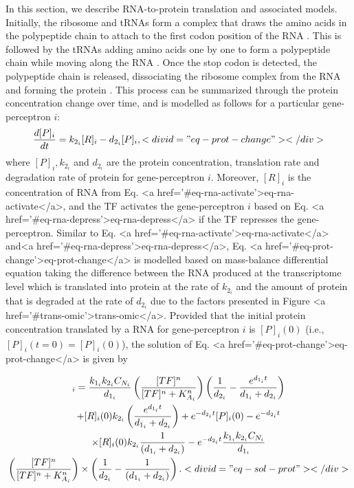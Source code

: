 \documentclass[twocolumn]{biophys-new}
\begin{document}
{{In this section, we describe RNA-to-protein translation and associated models.
Initially, the ribosome and tRNAs form a complex that draws the amino acids in the polypeptide chain to attach to the first codon position of the RNA \cite{saito2020translational}. This is followed by the tRNAs adding amino acids one by one to form a polypeptide chain while moving along the RNA \cite{xu2022functions}. Once the stop codon is detected, the polypeptide chain is released, dissociating the ribosome complex from the RNA and forming the protein \cite{marintchev2012fidelity}. This process can be summarized through the protein concentration change over time, and is modelled as follows for a particular gene-perceptron $i$:
\vspace{-0.2em}
\begin{equation}
\dfrac{d[P]_i}{dt} = k_{2_i}[R]_i - d_{2_i} [P]_i,<div id="eq-prot-change"></div>

\end{equation} 
where $[P]_i, k_{2_i}$ and $d_{2_i}$ are the protein concentration, translation rate and degradation rate of protein for gene-perceptron $i$. Moreover, $[R]_i$ is the concentration of RNA from Eq. <a href='#eq-rna-activate'>eq-rna-activate</a>, and the TF activates the gene-perceptron $i$ based on Eq. <a href='#eq-rna-depress'>eq-rna-depress</a> if the TF represses the gene-perceptron. Similar to Eq. <a href='#eq-rna-activate'>eq-rna-activate</a> and<a href='#eq-rna-depress'>eq-rna-depress</a>, Eq. <a href='#eq-prot-change'>eq-prot-change</a> is modelled based on mass-balance differential equation taking the difference between the RNA produced at the transcriptome level which is translated into protein at the rate of $k_{2_i}$ and the amount of protein that is degraded at the rate of $d_{2_i}$ due to the factors presented in Figure <a href='#trans-omic'>trans-omic</a>. 
Provided that the initial protein concentration translated by a RNA for gene-perceptron $i$ is $[P]_i(0)$ (i.e., $[P]_i(t=0)=[P]_i(0)$), the solution of Eq. <a href='#eq-prot-change'>eq-prot-change</a> is given by

\begin{multline}
[P]_i = \dfrac{k_{1_i}k_{2_i}C_{N_i}}{d_{1_i}} \left( \dfrac{[TF]^n}{[TF]^n+ K_{A_i}^n} \right) \left( \dfrac{1}{d_{2_i}} - \dfrac{e^{d_{1_i}t}}{d_{1_i}+d_{2_i} } \right) \\
+ [R]_i(0) k_{2_i} \left(\dfrac{e^{d_{1_i}t}}{d_{1_i} + d_{2_i}} \right) 
+e^{-d_{2_i}t}[P]_i(0)- e^{-d_{2_i}t} \\ \times [R]_i(0) k_{2_i}\dfrac{1}{(d_{1_i}+d_{2_i})} 
- e^{-d_{2_i}t}\dfrac{k_{1_i}k_{2_i} C_{N_i}}{d_{1_i}} \\ \left(\dfrac{[TF]^n}{[TF]^n+K_{A_i}^n} \right) 
\times \left( \dfrac{1}{d_{2_i}} - \dfrac{1}{(d_{1_i}+d_{2_i})} \right).
<div id="eq-sol-prot"></div>


\end{multline}}}
\end{document}

